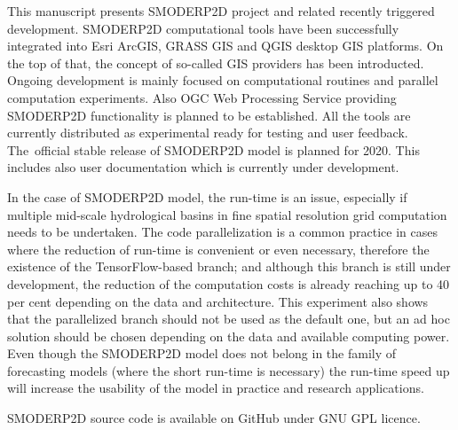 This manuscript presents SMODERP2D project and related recently
triggered development. SMODERP2D computational tools have been
successfully integrated into Esri ArcGIS, GRASS GIS and QGIS desktop
GIS platforms. On the top of that, the concept of so-called GIS providers
has been introducted. Ongoing development is mainly focused on
computational routines and parallel computation experiments. Also OGC
Web Processing Service providing SMODERP2D functionality is planned to
be established. All the tools are currently distributed as
experimental ready for testing and user feedback. The~official stable
release of SMODERP2D model is planned for 2020. This includes also
user documentation which is currently under development.

In the case of SMODERP2D model, the run-time is an issue, especially
if multiple mid-scale hydrological basins in fine spatial resolution
grid computation needs to be undertaken. The code parallelization is a
common practice in cases where the reduction of run-time is convenient
or even necessary, therefore the existence of the TensorFlow-based
branch; and although this branch is still under development, the
reduction of the computation costs is already reaching up to 40
per cent depending on the data and architecture. This experiment also
shows that the parallelized branch should not be used as the default
one, but an ad hoc solution should be chosen depending on the data and
available computing power. Even though the SMODERP2D model does not
belong in the family of forecasting models (where the short run-time
is necessary) the run-time speed up will increase the usability of the
model in practice and research applications.

SMODERP2D source code is available on GitHub
\cite{smoderp2d-github-2019} under GNU GPL licence. 
